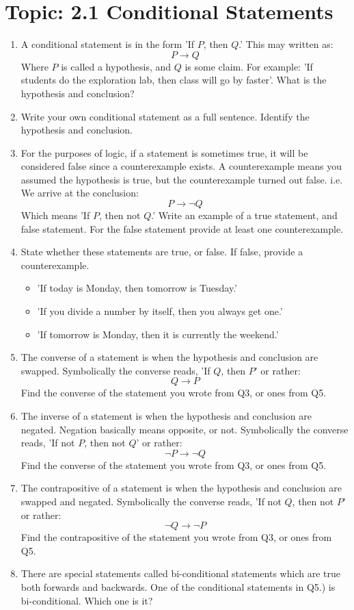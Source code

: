 \documentclass[12pt,letterpaper]{article}
\begin{document}
\section*{Topic: 2.1 Conditional Statements}
\begin{enumerate}
    \item A conditional statement is in the form 'If $P$, then $Q$.' This may written as: $$P\to Q$$ Where $P$ is called a hypothesis, and $Q$ is some claim. For example: 'If students do the exploration lab, then class will go by faster'. What is the hypothesis and conclusion?
    \item Write your own conditional statement as a full sentence. Identify the hypothesis and conclusion.
    \item For the purposes of logic, if a statement is sometimes true, it will be considered false since a counterexample exists. A counterexample means you assumed the hypothesis is true, but the counterexample turned out false. i.e. We arrive at the conclusion: $$P\to \neg Q$$ Which means 'If $P$, then not $Q$.' Write an example of a true statement, and false statement. For the false statement provide at least one counterexample.
    \item State whether these statements are true, or false. If false, provide a counterexample.
          \begin{itemize}
              \item 'If today is Monday, then tomorrow is Tuesday.'
              \item 'If you divide a number by itself, then you always get one.'
              \item 'If tomorrow is Monday, then it is currently the weekend.'
          \end{itemize}
    \item The converse of a statement is when the hypothesis and conclusion are swapped. Symbolically the converse reads, 'If $Q$, then $P$' or rather: $$Q\to P$$ Find the converse of the statement you wrote from Q3, or ones from Q5.
    \item The inverse of a statement is when the hypothesis and conclusion are negated. Negation basically means opposite, or not. Symbolically the converse reads, 'If not $P$, then not $Q$' or rather:$$\neg P\to \neg Q$$ Find the converse of the statement you wrote from Q3, or ones from Q5.
    \item The contrapositive of a statement is when the hypothesis and conclusion are swapped and negated. Symbolically the converse reads, 'If not $Q$, then not $P$' or rather: $$\neg Q\to \neg P$$ Find the contrapositive of the statement you wrote from Q3, or ones from Q5.
    \item There are special statements called bi-conditional statements which are true both forwards and backwards. One of the conditional statements in Q5.) is bi-conditional. Which one is it?
\end{enumerate}
\end{document}
